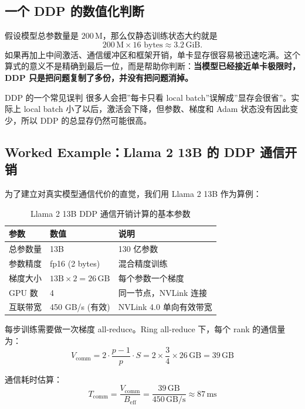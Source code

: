 \subsection{一个 DDP 的数值化判断}

假设模型总参数量是 $200\,\text{M}$，那么仅静态训练状态大约就是
\[
200\,\text{M} \times 16 \text{ bytes} \approx 3.2\,\text{GiB}.
\]
如果再加上中间激活、通信缓冲区和框架开销，单卡显存很容易被迅速吃满。这个算式的意义不是精确到最后一位，而是帮助你判断：\textbf{当模型已经接近单卡极限时，DDP 只是把问题复制了多份，并没有把问题消掉。}

\begin{warningbox}{DDP 的一个常见误判}
很多人会把”每卡只看 local batch”误解成”显存会很省”。实际上 local batch 小了以后，激活会下降，但参数、梯度和 Adam 状态没有因此变少，所以 DDP 的总显存仍然可能很高。
\end{warningbox}

\subsection{Worked Example：Llama 2 13B 的 DDP 通信开销}

为了建立对真实模型通信代价的直觉，我们用 Llama 2 13B 作为算例：

\begin{table}[H]
\centering
\small
\begin{tabular}{p{4cm}p{3cm}p{5cm}}
\toprule
\textbf{参数} & \textbf{数值} & \textbf{说明} \\
\midrule
总参数量 & 13B & 130 亿参数 \\
参数精度 & fp16 (2 bytes) & 混合精度训练 \\
梯度大小 & $13\text{B} \times 2 = 26\,\text{GB}$ & 每个参数一个梯度 \\
GPU 数 & 4 & 同一节点，NVLink 连接 \\
互联带宽 & 450 GB/s (有效) & NVLink 4.0 单向有效带宽 \\
\bottomrule
\end{tabular}
\caption{Llama 2 13B DDP 通信开销计算的基本参数}
\end{table}

每步训练需要做一次梯度 all-reduce。Ring all-reduce 下，每个 rank 的通信量为：
\[
V_{\text{comm}} = 2 \cdot \frac{p-1}{p} \cdot S = 2 \times \frac{3}{4} \times 26\,\text{GB} = 39\,\text{GB}
\]

通信耗时估算：
\[
T_{\text{comm}} = \frac{V_{\text{comm}}}{B_{\text{eff}}} = \frac{39\,\text{GB}}{450\,\text{GB/s}} \approx 87\,\text{ms}
\]

